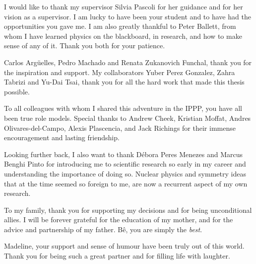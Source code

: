 \documentclass[openany,twoside,frontopenright,chaprunninghead]{ip3thesis}
\begin{document}
\begin{acknowledgements*}

	I would like to thank my supervisor Silvia Pascoli for her guidance and for her vision as a supervisor. I am lucky to have been your student and to have had the opportunities you gave me. I am also greatly thankful to Peter Ballett, from whom I have learned physics on the blackboard, in research, and how to make sense of any of it. Thank you both for your patience.
	
	\vspace{2ex}
	Carlos Arg\"uelles, Pedro Machado and Renata Zukanovich Funchal, thank you for the inspiration and support. My collaborators Yuber Perez Gonzalez, Zahra Tabrizi and Yu-Dai Tsai, thank you for all the hard work that made this thesis possible. 

	\vspace{2ex}
	To all colleagues with whom I shared this adventure in the IPPP, you have all been true role models. Special thanks to Andrew Cheek, Kristian Moffat, Andres Olivares-del-Campo, Alexis Plascencia, and Jack Richings for their immense encouragement and lasting friendship.
	
	\vspace{2ex}
	Looking further back, I also want to thank D\'ebora Peres Menezes and Marcus Benghi Pinto for introducing me to scientific research so early in my career and understanding the importance of doing so. Nuclear physics and symmetry ideas that at the time seemed so foreign to me, are now a recurrent aspect of my own research.
	
	\vspace{2ex}
	To my family, thank you for supporting my decisions and for being unconditional allies. I will be forever grateful for the education of my mother, and for the advice and partnership of my father. B\^e, you are simply the \emph{best}.
	
	\vspace{2ex}
	Madeline, your support and sense of humour have been truly out of this world. Thank you for being such a great partner and for filling life with laughter.
	
\end{acknowledgements*}



\cleardoublepage

\begin{epigraph*}
% 
% 
\end{epigraph*} 
\end{document}
